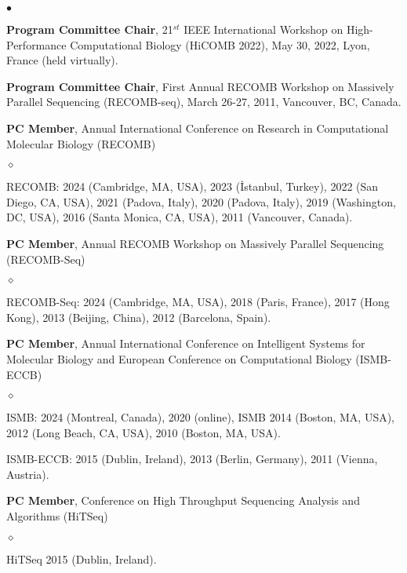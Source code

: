 \documentclass[margin,line]{res}
\newenvironment{list2}{
  \begin{list}{$\bullet$}{%
      \setlength{\itemsep}{0.1cm}
      \setlength{\parsep}{0in} \setlength{\parskip}{0in}
      \setlength{\topsep}{0in} \setlength{\partopsep}{0in} 
      \setlength{\leftmargin}{0.2in}}}{\end{list}}
\newenvironment{list3}{
  \begin{list}{$\diamond$}{%
      \setlength{\itemsep}{0in}
      \setlength{\parsep}{0.1cm} \setlength{\parskip}{0.1cm}
      \setlength{\topsep}{0.1cm} \setlength{\partopsep}{0.1cm} 
      \setlength{\leftmargin}{0.2in}}}{\end{list}}
\begin{document}
\begin{resume}
\begin{list2}
\item 
\textbf{Program Committee Chair}, 21$^{st}$ IEEE International Workshop on High-Performance Computational Biology (HiCOMB 2022), May 30, 2022, Lyon, France (held virtually).

\item
  \textbf{Program Committee Chair}, First Annual RECOMB Workshop on Massively Parallel Sequencing (RECOMB-seq), March 26-27, 2011, Vancouver, BC, Canada.
  
  \item
  \textbf{PC Member}, Annual International Conference on Research in Computational Molecular Biology (RECOMB)
  \begin{list3}
    \item RECOMB: 2024 (Cambridge, MA, USA), 2023 (İstanbul, Turkey), 2022 (San Diego, CA, USA),
     2021 (Padova, Italy), 2020 (Padova, Italy),  2019 (Washington, DC, USA),   2016 (Santa Monica, CA, USA),  2011 (Vancouver, Canada).
  \end{list3}
  
\item 
\textbf{PC Member},  Annual RECOMB Workshop on Massively Parallel Sequencing (RECOMB-Seq)
\begin{list3}
    \item RECOMB-Seq: 2024 (Cambridge, MA, USA), 2018 (Paris, France),  2017 (Hong Kong), 2013 (Beijing, China),  2012 (Barcelona, Spain).
\end{list3}


\item
  \textbf{PC Member}, Annual International Conference on Intelligent Systems for Molecular Biology and  European Conference on 
  Computational Biology  (ISMB-ECCB)
  \begin{list3}
  \item ISMB: 2024 (Montreal, Canada), 2020 (online), ISMB 2014 (Boston, MA, USA), 2012 (Long Beach, CA, USA),  2010 (Boston, MA, USA).
  \item ISMB-ECCB: 2015 (Dublin, Ireland), 2013 (Berlin, Germany), 2011 (Vienna, Austria).
  \end{list3}

\item
  \textbf{PC Member}, Conference on High Throughput Sequencing Analysis and Algorithms (HiTSeq)
  \begin{list3}
      \item HiTSeq 2015 (Dublin, Ireland).
  \end{list3}



\end{list2}
\end{resume}
\end{document}
